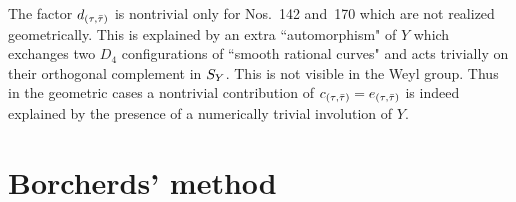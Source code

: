 \documentclass{amsart}
\numberwithin{procedure}{section}
\begin{document}
%
%
%
\begin{remark}\label{rem:142and170}
The factor $d_{(\tau,\bar{\tau})}$ is nontrivial only for
Nos.~142 and~170 which are not realized geometrically.
This is explained by an extra ``automorphism" of $Y$ which exchanges two $D_4$ configurations of ``smooth rational curves" and acts trivially on their orthogonal complement in $S_{Y}$. 
This is not visible in the Weyl group.
Thus in the geometric cases a nontrivial contribution of $c_{(\tau,\bar{\tau})}=e_{(\tau,\bar{\tau})}$ is indeed explained by the presence of a numerically trivial involution of $Y$.
\end{remark}

%
\section{Borcherds' method}\label{sec:Borcherds}
%
\end{document}
